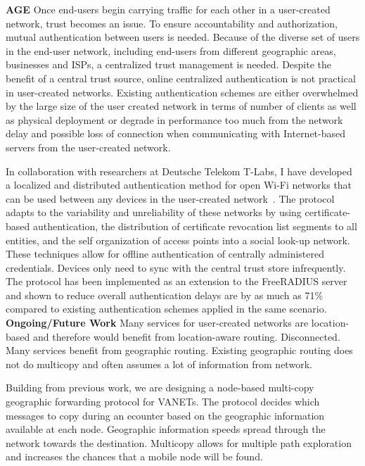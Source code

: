 \documentclass[10pt]{article}
\begin{document}
\noindent \textbf{AGE}
Once end-users begin carrying traffic for each other in a user-created network,
trust becomes an issue.  
To ensure accountability and authorization, mutual authentication between users
is needed.
Because of the diverse set of users in the end-user network, including end-users
from different geographic areas, businesses and ISPs, a centralized trust
management is needed.
Despite the benefit of a central trust source, online centralized authentication
is not practical in user-created networks.  Existing authentication schemes are
either overwhelmed by the large size of the
user created network in terms of number of clients as well as physical
deployment or degrade in performance too much from the network delay and
possible loss of connection when
communicating with Internet-based servers from the user-created network.

In collaboration with researchers at Deutsche Telekom T-Labs, I have developed
a localized and distributed
authentication method for open Wi-Fi networks that can be used between any
devices in the user-created
network~\cite{thompson:age:mobicom07, thompson:organic:hotmobile08}.
The protocol
adapts to the variability and unreliability of these networks by using 
certificate-based authentication, the distribution of certificate revocation
list segments to all entities, and the self organization of access points into a
social look-up network.  These techniques allow for offline authentication of
centrally administered credentials.  Devices only need to sync with the central
trust store infrequently.
The protocol has been implemented as an extension to the FreeRADIUS server and
shown to reduce overall
authentication delays are by as much as 71\% compared to existing
authentication schemes applied in the same scenario.   \\


\noindent \textbf{Ongoing/Future Work}
Many services for user-created networks are location-based and therefore would
benefit from location-aware routing.
Disconnected.  Many services benefit from geographic routing.  Existing
geographic routing does not do multicopy and often assumes a lot of information
from network.

Building from previous work, we are designing a node-based multi-copy geographic
forwarding protocol for VANETs.  The protocol decides which messages to copy
during an ecounter based on the geographic information available at each node.
Geographic information speeds spread through the network towards the
destination.  Multicopy allows for multiple path exploration and increases the
chances that a mobile node will be found. \\
\end{document}
